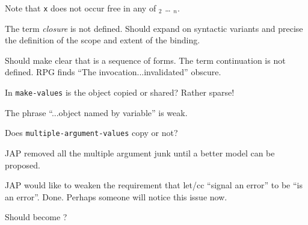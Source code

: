 \begin{optDefinition}
Note that {\tt x} does not occur free in any of $_2$ \ldots
{}$_n$.
%
\end{optDefinition}

\label{subsubsec:variable-binding}
%
\begin{optPrivate}
    The term {\em closure} is not defined.  Should expand on syntactic variants
    and precise the definition of the scope and extent of the binding.

    Should make clear that  is a sequence of forms.  The term
    continuation is not defined.  RPG finds ``The invocation...invalidated''
    obscure.

    In {\tt make-values} is the object copied or shared?  Rather sparse!

    The phrase ``...object named by variable'' is weak.

    Does {\tt multiple-argument-values} copy or not?

    JAP removed all the multiple argument junk until a better model can be
    proposed.

    JAP would like to weaken the requirement that let/cc ``signal an error'' to
    be ``is an error''.  Done.  Perhaps someone will notice this issue now.

    Should  become ?
\end{optPrivate}
%
